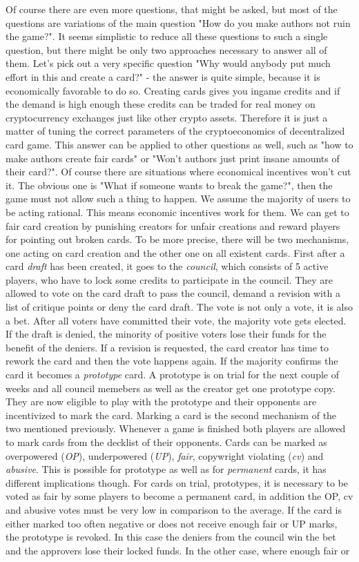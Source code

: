 \documentclass{article}
\begin{document}
%
Of course there are even more questions, that might be asked, but most of the questions are variations of the main question "How do you make authors not ruin the game?". It seems simplistic to reduce all these questions to such a single question, but there might be only two approaches necessary to answer all of them. Let's pick out a very specific question "Why would anybody put much effort in this and create a card?" - the answer is quite simple, because it is economically favorable to do so. Creating cards gives you ingame credits and if the demand is high enough these credits can be traded for real money on cryptocurrency exchanges just like other crypto assets. Therefore it is just a matter of tuning the correct parameters of the cryptoeconomics of decentralized card game. This answer can be applied to other questions as well, such as "how to make authors create fair cards" or "Won't authors just print insane amounts of their card?". Of course there are situations where economical incentives won't cut it. The obvious one is "What if someone wants to break the game?", then the game must not allow such a thing to happen. We assume the majority of users to be acting rational. This means economic incentives work for them. We can get to fair card creation by punishing creators for unfair creations and reward players for pointing out broken cards. To be more precise, there will be two mechanisms, one acting on card creation and the other one on all existent cards. First after a card \textit{draft} has been created, it goes to the \textit{council}, which consists of 5 active players, who have to lock some credits to participate in the council. They are allowed to vote on the card draft to pass the council, demand a revision with a list of critique points or deny the card draft. The vote is not only a vote, it is also a bet. After all voters have committed their vote, the majority vote gets elected. If the draft is denied, the minority of positive voters lose their funds for the benefit of the deniers. If a revision is requested, the card creator has time to rework the card and then the vote happens again. If the majority confirms the card it becomes a \textit{prototype} card. A prototype is on trial for the next couple of weeks and all council memebers as well as the creator get one prototype copy. They are now eligible to play with the prototype and their opponents are incentivized to mark the card. Marking a card is the second mechanism of the two mentioned previously. Whenever a game is finished both players are allowed to mark cards from the decklist of their opponents. Cards can be marked as overpowered (\textit{OP}), underpowered (\textit{UP}), \textit{fair}, copywright violating (\textit{cv}) and \textit{abusive}. This is possible for prototype as well as for \textit{permanent} cards, it has different implications though. For cards on trial, prototypes, it is necessary to be voted as fair by some players to become a permanent card, in addition the OP, cv and abusive votes must be very low in comparison to the average. If the card is either marked too often negative or does not receive enough fair or UP marks, the prototype is revoked. In this case the deniers from the council win the bet and the approvers lose their locked funds. In the other case, where enough fair or 
\end{document}
